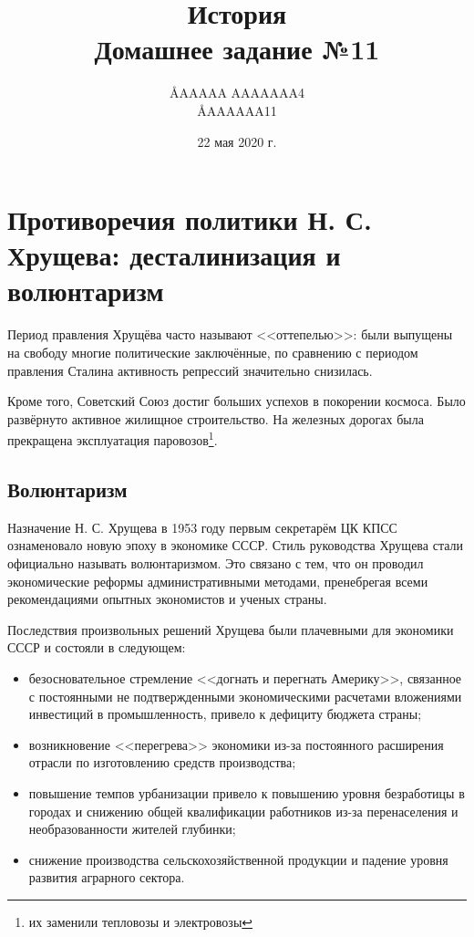 \documentclass[12pt]{article}
\title{История \\ Домашнее задание №11}
\author{\AA{AAAAA AAAAAAA}{4} \\ \AA{AAAAAA}{11}}
\date{22 мая 2020 г.}
\begin{document}
  \maketitle

  \section{Противоречия политики Н. С. Хрущева: десталинизация и волюнтаризм}
  Период правления Хрущёва часто называют <<оттепелью>>: были выпущены на свободу многие политические заключённые,
  по сравнению с периодом правления Сталина активность репрессий значительно снизилась.

  Кроме того, Советский Союз достиг больших успехов в покорении космоса.
  Было развёрнуто активное жилищное строительство.
  На железных дорогах была прекращена эксплуатация паровозов\footnote{их заменили тепловозы и электровозы}.

  \subsection{Волюнтаризм}
  Назначение Н. С. Хрущева в 1953 году первым секретарём ЦК КПСС ознаменовало новую эпоху в экономике СССР.
  Стиль руководства Хрущева стали официально называть волюнтаризмом.
  Это связано с тем, что он проводил экономические реформы административными методами,
  пренебрегая всеми рекомендациями опытных экономистов и ученых страны.

  Последствия произвольных решений Хрущева были плачевными для экономики СССР и состояли в следующем:
  \begin{itemize}
    \item безосновательное стремление <<догнать и перегнать Америку>>, связанное с постоянными не подтвержденными экономическими расчетами вложениями инвестиций в промышленность, привело к дефициту бюджета страны;
    \item возникновение <<перегрева>> экономики из-за постоянного расширения отрасли по изготовлению средств производства;
    \item повышение темпов урбанизации привело к повышению уровня безработицы в городах и снижению общей квалификации работников из-за перенаселения и необразованности жителей глубинки;
    \item снижение производства сельскохозяйственной продукции и падение уровня развития аграрного сектора.
  \end{itemize}
\end{document}
